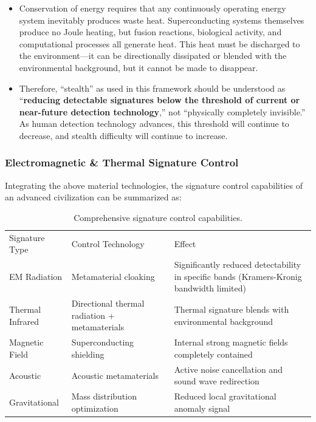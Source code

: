 \documentclass[aps,prd,twocolumn,superscriptaddress,nofootinbib]{revtex4-2}
\begin{document}
\begin{itemize}
  \item Conservation of energy requires that any continuously operating energy system inevitably produces waste heat. Superconducting systems themselves produce no Joule heating, but fusion reactions, biological activity, and computational processes all generate heat. This heat must be discharged to the environment---it can be directionally dissipated or blended with the environmental background, but it cannot be made to disappear.
  \item Therefore, ``stealth'' as used in this framework should be understood as ``\textbf{reducing detectable signatures below the threshold of current or near-future detection technology},'' not ``physically completely invisible.'' As human detection technology advances, this threshold will continue to decrease, and stealth difficulty will continue to increase.
\end{itemize}

\subsubsection{Electromagnetic \& Thermal Signature Control}\label{sec:em-thermal-control}

Integrating the above material technologies, the signature control capabilities of an advanced civilization can be summarized as:

\begin{table}[htbp]
\caption{Comprehensive signature control capabilities.}
\label{tab:signature-control}
\begin{ruledtabular}
\begin{tabular}{lll}
Signature Type & Control Technology & Effect \\
\colrule
EM Radiation & Metamaterial cloaking & Significantly reduced detectability in specific bands (Kramers-Kronig bandwidth limited) \\
Thermal Infrared & Directional thermal radiation + metamaterials & Thermal signature blends with environmental background \\
Magnetic Field & Superconducting shielding & Internal strong magnetic fields completely contained \\
Acoustic & Acoustic metamaterials & Active noise cancellation and sound wave redirection \\
Gravitational & Mass distribution optimization & Reduced local gravitational anomaly signal \\
\end{tabular}
\end{ruledtabular}
\end{table}
\end{document}
